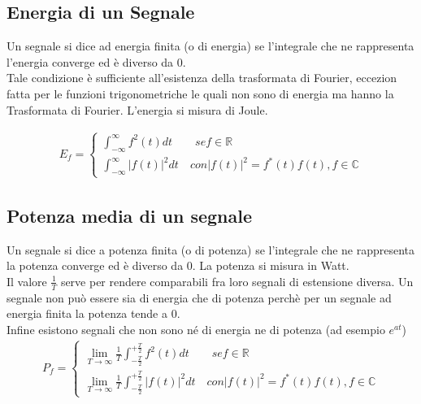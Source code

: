     \subsection{Energia di un Segnale}
    \begin{minipage}{.4\textwidth}
        Un segnale si dice ad energia finita (o di energia) se l’integrale che ne rappresenta l’energia converge ed è diverso da 0.\\
        Tale condizione è sufficiente all'esistenza della trasformata di Fourier, eccezion fatta per le funzioni trigonometriche le quali non sono di energia ma hanno la Trasformata di Fourier.
        L'energia si misura di Joule.
    \end{minipage}
    \hspace{0.2cm}
    \begin{minipage}{.5\textwidth}
        \begin{align*}
                E_f=\begin{cases}
                     \int_{-\infty}^{\infty} f^2(t)dt \qquad se f\in\mathbb{R}\\
                     \int_{-\infty}^{\infty} |f(t)|^2dt \quad con |f(t)|^2=f^*(t)f(t), f \in\mathbb{C}
                \end{cases}
        \end{align*}
    \end{minipage}
    
    \subsection{Potenza media di un segnale}
    Un segnale si dice a potenza finita (o di potenza) se l'integrale che ne rappresenta la potenza converge ed è diverso da 0. La potenza si misura in Watt.\\
    Il valore $\frac{1}{T}$ serve per rendere comparabili fra loro segnali di estensione diversa.
    Un segnale non può essere sia di energia che di potenza perchè per un segnale ad energia finita la potenza tende a 0.\\
    Infine esistono segnali che non sono né di energia ne di potenza (ad esempio $e^{at}$)
    \begin{align*}
        P_f=\begin{cases}
           \lim_{T\to\infty}\frac{1}{T}\int_{-\frac{T}{2}}^{+\frac{T}{2}} f^2(t)dt \qquad se f\in\mathbb{R}\\
           \lim_{T\to\infty}\frac{1}{T}\int_{-\frac{T}{2}}^{+\frac{T}{2}} |f(t)|^2dt \quad con |f(t)|^2=f^*(t)f(t), f \in\mathbb{C}
        \end{cases}
    \end{align*}